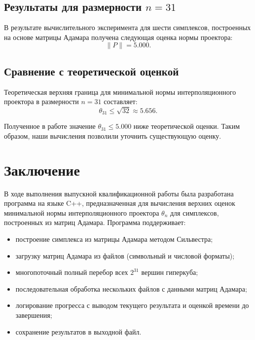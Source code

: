 \documentclass[a4paper,12pt]{article}
\theoremstyle{indented}
\begin{document}
\subsection{Результаты для размерности $n = 31$}

В результате вычислительного эксперимента для шести симплексов, построенных на основе матрицы Адамара получена следующая оценка нормы проектора:
\[
\|P\| = 5.000.
\]

\subsection{Сравнение с теоретической оценкой}

Теоретическая верхняя граница для минимальной нормы интерполяционного проектора в размерности $n = 31$ составляет:
\[
\theta_{31} \le \sqrt{32} \approx 5.656.
\]

Полученное в работе значение $\theta_{31} \le 5.000$ ниже теоретической оценки. Таким образом, наши вычисления позволили уточнить существующую оценку.

\newpage

\section*{Заключение}

В ходе выполнения выпускной квалификационной работы была разработана программа на языке C++, предназначенная для вычисления верхних оценок минимальной нормы интерполяционного проектора $\theta_n$ для симплексов, построенных из матриц Адамара. Программа поддерживает:

\begin{itemize}
    \item построение симплекса из матрицы Адамара методом Сильвестра;
    \item загрузку матриц Адамара из файлов (символьный и числовой форматы);
    \item многопоточный полный перебор всех $2^{31}$ вершин гиперкуба;
    \item последовательная обработка нескольких файлов с данными матриц Адамара;
    \item логирование прогресса с выводом текущего результата и оценкой времени до завершения;
    \item сохранение результатов в выходной файл.
\end{itemize}
\end{document}
